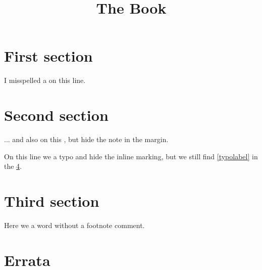 \documentclass[a4paper,12pt]{article}
\title{The Book}
\begin{document}
\section{First section}\label{sect:first}
I misspelled a  on this line.

\section{Second section}

... and also on this , but hide
the note in the margin.

On this line we  a typo and hide the inline marking, but we
still find \cref{typolabel} in the \cref{chap:errata}.

\section{Third section}

Here we  a word without a footnote comment.

\section{Errata}\label{chap:errata}

\PrintErrata
\end{document}
